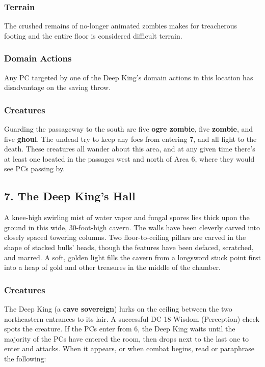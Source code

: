 \documentclass[10pt,a4paper,twoside,bg=print,twocolumn,openany,nodeprecatedcode]{dndbook}
\begin{document}
\subsubsection{Terrain}
The crushed remains of no-longer animated zombies makes for treacherous footing and the entire floor is considered difficult terrain.

\subsubsection{Domain Actions}
Any PC targeted by one of the Deep King's domain actions in this location has disadvantage on the saving throw.

\subsubsection{Creatures}
Guarding the passageway to the south are five \textbf{ogre zombie}, five \textbf{zombie}, and five \textbf{ghoul}. The undead try to keep any foes from entering 7, and all fight to the death. These creatures all wander about this area, and at any given time there's at least one located in the passages west and north of Area 6, where they would see PCs passing by.

\subsection{7. The Deep King's Hall}
\begin{DndReadAloud}{}
A knee-high swirling mist of water vapor and fungal spores lies thick upon the ground in this wide, 30-foot-high cavern. The walls have been cleverly carved into closely spaced towering columns. Two floor-to-ceiling pillars are carved in the shape of stacked bulls' heads, though the features have been defaced, scratched, and marred. A soft, golden light fills the cavern from a longsword stuck point first into a heap of gold and other treasures in the middle of the chamber.

\end{DndReadAloud}

\subsubsection{Creatures}
The Deep King (a \textbf{cave sovereign}) lurks on the ceiling between the two northeastern entrances to its lair. A successful DC 18 Wisdom (Perception) check spots the creature. If the PCs enter from 6, the Deep King waits until the majority of the PCs have entered the room, then drops next to the last one to enter and attacks. When it appears, or when combat begins, read or paraphrase the following:
\end{document}
